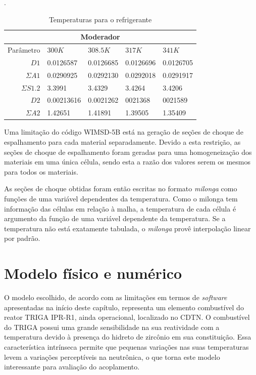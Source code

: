 \begin{table}[htb]
  \caption[Temperaturas para o refrigerante.]{Temperaturas para o refrigerante}.
  \label{tab:temp-coolant}
  \begin{tabular}{r l l l l}
    \multicolumn{5}{c}{Moderador} \\
    \hline
    Parâmetro & $300K$ & $308.5K$ & $317K$ & $341K$ \\
    \hline
    $D1$ & 0.0126587 & 0.0126685 & 0.0126696 & 0.0126705\\
    $\Sigma A1$ & 0.0290925 & 0.0292130 & 0.0292018 & 0.0291917\\
    $\Sigma S1.2$ & 3.3991 & 3.4329 & 3.4264 & 3.4206\\
    \hline
    $D2$ & 0.00213616 & 0.0021262 & 0021368 & 0021589\\
    $\Sigma A2$ & 1.42651 & 1.41891 & 1.39505 & 1.35409\\
    \hline
  \end{tabular}
\end{table}

Uma limitação do código WIMSD-5B está na geração de seções de choque de espalhamento
para cada material separadamente. Devido a esta restrição, as seções de choque de
espalhamento foram geradas para uma homogeneização dos materiais em uma única célula,
sendo esta a razão dos valores serem os mesmos para todos os materiais.


%
%
As seções de choque obtidas foram então escritas no formato \textit{milonga} como
funções de uma variável dependentes da temperatura. Como o milonga tem informação
das células em relação à malha, a temperatura de cada célula é argumento da
função de uma variável dependente da temperatura. Se a temperatura não está
exatamente tabulada, o \textit{milonga} provê interpolação linear por padrão.

\section{Modelo físico e numérico}
\label{sec:mod_fis_num}

O modelo escolhido, de acordo com as limitações em termos
de \textit{software} apresentadas na início deste capítulo, representa um
elemento combustível do reator TRIGA IPR-R1, ainda operacional, localizado
no CDTN. O combustível do TRIGA possui uma grande sensibilidade na sua
reatividade com a temperatura devido à presença do hidreto de zircônio
em sua constituição. Essa característica intrínseca permite que pequenas
variações nas suas temperaturas levem a variações perceptíveis na neutrônica,
o que torna este modelo interessante para avaliação do acoplamento.

